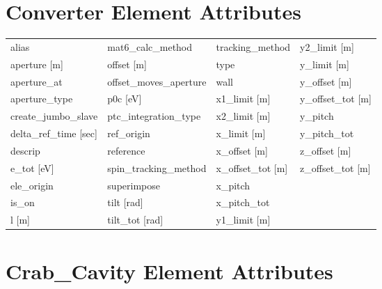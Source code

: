  \section{Converter Element Attributes}
 \label{s:list.converter}
 
 \begin{tabular}{llll} \toprule
alias                          & mat6_calc_method               & tracking_method                & y2_limit [m]                   \\
aperture [m]                   & offset [m]                     & type                           & y_limit [m]                    \\
aperture_at                    & offset_moves_aperture          & wall                           & y_offset [m]                   \\
aperture_type                  & p0c [eV]                       & x1_limit [m]                   & y_offset_tot [m]               \\
create_jumbo_slave             & ptc_integration_type           & x2_limit [m]                   & y_pitch                        \\
delta_ref_time [sec]           & ref_origin                     & x_limit [m]                    & y_pitch_tot                    \\
descrip                        & reference                      & x_offset [m]                   & z_offset [m]                   \\
e_tot [eV]                     & spin_tracking_method           & x_offset_tot [m]               & z_offset_tot [m]               \\
ele_origin                     & superimpose                    & x_pitch                        &                                \\
is_on                          & tilt [rad]                     & x_pitch_tot                    &                                \\
l [m]                          & tilt_tot [rad]                 & y1_limit [m]                   &                                \\
 \bottomrule
 \end{tabular}
 \vfill
 
 \section{Crab_Cavity Element Attributes}
 \label{s:list.crab.cavity}
 
